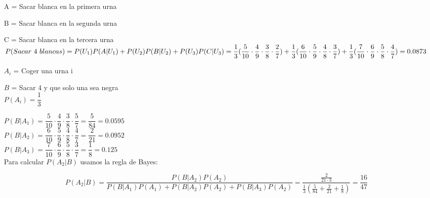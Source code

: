 \subproblem
A = Sacar blanca en la primera urna

B = Sacar blanca en la segunda urna

C = Sacar blanca en la tercera urna \\


$P(Sacar\ 4 \ blancas) = P(U_1)P(A|U_1) + P(U_2)P(B|U_2) + P(U_3)P(C|U_3) = \\


\dfrac{1}{3}(\dfrac{5}{10}\cdot\dfrac{4}{9}\cdot\dfrac{3}{8}\cdot\dfrac{2}{7}) + 
  \dfrac{1}{3}(\dfrac{6}{10}\cdot\dfrac{5}{9}\cdot\dfrac{4}{8}\cdot\dfrac{3}{7}) + 
  \dfrac{1}{3}(\dfrac{7}{10}\cdot\dfrac{6}{9}\cdot\dfrac{5}{8}\cdot\dfrac{4}{7}) = 0.0873$ \\

\subproblem

$A_i$ = Coger una urna i 

$B$ = Sacar 4 y que solo una sea negra \\

$P(A_i) = \dfrac{1}{3}$

$P(B|A_1) = \dfrac{5}{10} \cdot \dfrac{4}{9} \cdot \dfrac{3}{8} \cdot \dfrac{5}{7} = \dfrac{5}{84} = 0.0595$ \\

$P(B|A_2) = \dfrac{6}{10} \cdot \dfrac{5}{9} \cdot \dfrac{4}{8} \cdot \dfrac{4}{7} = \dfrac{2}{21} = 0.0952$ \\

$P(B|A_3) = \dfrac{7}{10} \cdot \dfrac{6}{9} \cdot \dfrac{5}{8} \cdot \dfrac{3}{7} = \dfrac{1}{8} = 0.125$ \\


Para calcular $P(A_2|B)$ usamos la regla de Bayes:

$$ P(A_2|B) = \dfrac{P(B|A_2)P(A_2)}{P(B|A_1)P(A_1)+P(B|A_2)P(A_2)+P(B|A_3)P(A_2)} = \dfrac{\frac{2}{21 \cdot 3}}{\frac{1}{3}(\frac{5}{84} + \frac{2}{21} + \frac{1}{8})} = \dfrac{16}{47}$$
